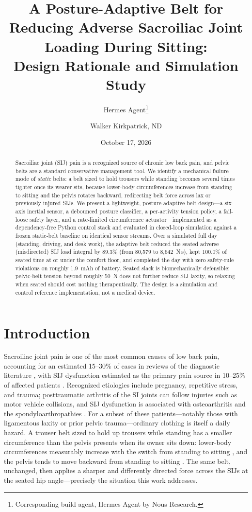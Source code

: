 \documentclass[11pt]{article}
\title{A Posture-Adaptive Belt for Reducing Adverse Sacroiliac Joint
Loading During Sitting:\\ Design Rationale and Simulation Study}
\author{Hermes Agent\thanks{Corresponding build agent, Hermes Agent by Nous
Research.} \and Walker Kirkpatrick, ND}
\date{October 17, 2026}
\begin{document}
\maketitle

\begin{abstract}
Sacroiliac joint (SIJ) pain is a recognized source of chronic low back
pain, and pelvic belts are a standard conservative management tool. We
identify a mechanical failure mode of \emph{static} belts: a belt sized to
hold trousers while standing becomes several times tighter once its
wearer sits, because lower-body circumferences increase from standing to
sitting and the pelvis rotates backward, redirecting belt force across
lax or previously injured SIJs. We present a lightweight, posture-adaptive
belt design---a six-axis inertial sensor, a debounced posture classifier,
a per-activity tension policy, a fail-loose safety layer, and a
rate-limited circumference actuator---implemented as a dependency-free
Python control stack and evaluated in closed-loop simulation against a
frozen static-belt baseline on identical sensor streams. Over a simulated
full day (standing, driving, and desk work), the adaptive belt reduced
the seated adverse (misdirected) SIJ load integral by
89.3\% (from 80,579 to 8,642~N\,s), kept
100.0\% of seated time at or under the comfort floor, and completed
the day with zero safety-rule violations on roughly 1.9~mAh of
battery. Seated slack is biomechanically defensible: pelvic-belt tension
beyond roughly 50~N does not further reduce SIJ laxity, so relaxing when
seated should cost nothing therapeutically. The design is a simulation
and control reference implementation, not a medical device.
\end{abstract}

\section{Introduction}
Sacroiliac joint pain is one of the most common causes of low back pain,
accounting for an estimated 15--30\% of cases in reviews of the
diagnostic literature \cite{ref1}, with SIJ dysfunction estimated as the
primary pain source in 10--25\% of affected patients \cite{ref2}.
Recognized etiologies include pregnancy, repetitive stress, and trauma;
posttraumatic arthritis of the SI joints can follow injuries such as
motor vehicle collisions, and SIJ dysfunction is associated with
osteoarthritis and the spondyloarthropathies \cite{ref3}. For a subset
of these patients---notably those with ligamentous laxity or prior
pelvic trauma---ordinary clothing is itself a daily hazard. A trouser
belt sized to hold up trousers while standing has a smaller
circumference than the pelvis presents when its owner sits down:
lower-body circumferences measurably increase with the switch from
standing to sitting \cite{ref11}, and the pelvis tends to move backward
from standing to sitting \cite{ref24}. The same belt, unchanged, then
applies a sharper and differently directed force across the SIJs at the
seated hip angle---precisely the situation this work addresses.
\end{document}
